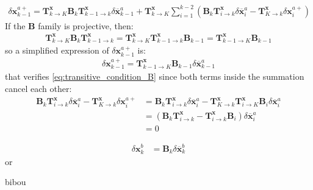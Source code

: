 \documentclass[npg, manuscript]{copernicus}
\begin{document}
\begin{align}
\delta \mathbf{x}^{a+}_{k-1} = \mathbf{T}^\mathbf{x}_{k \rightarrow K} \mathbf{B}_k \mathbf{T}^\mathbf{x}_{k-1 \rightarrow k} \delta \overline{\mathbf{x}}^a_{k-1} + \mathbf{T}^\mathbf{x}_{k \rightarrow K} \sum_{i=1}^{k-2} \left(\mathbf{B}_k \mathbf{T}^\mathbf{x}_{i \rightarrow k} \delta \overline{\mathbf{x}}^a_i - \mathbf{T}^\mathbf{x}_{K \rightarrow k} \delta \mathbf{x}^{a+}_i\right)
\end{align}
If the $\mathbf{B}$ family is projective, then:
\begin{align}
\mathbf{T}^\mathbf{x}_{k \rightarrow K} \mathbf{B}_k \mathbf{T}^\mathbf{x}_{k-1 \rightarrow k} = \mathbf{T}^\mathbf{x}_{k \rightarrow K} \mathbf{T}^\mathbf{x}_{k-1 \rightarrow k} \mathbf{B}_{k-1} = \mathbf{T}^\mathbf{x}_{k-1 \rightarrow K} \mathbf{B}_{k-1}
\end{align}
so a simplified expression of $\delta \mathbf{x}^{a+}_{k-1}$ is:
\begin{align}
\label{eq:projective_condition_B}
\boxed{\delta \mathbf{x}^{a+}_{k-1} = \mathbf{T}^\mathbf{x}_{k-1 \rightarrow K} \mathbf{B}_{k-1} \delta \overline{\mathbf{x}}^a_{k-1}}
\end{align}
that verifies \eqref{eq:transitive_condition_B} since both terms inside the summation cancel each other:
\begin{align}
\mathbf{B}_k \mathbf{T}^\mathbf{x}_{i \rightarrow k} \delta \overline{\mathbf{x}}^a_i - \mathbf{T}^\mathbf{x}_{K \rightarrow k} \delta \mathbf{x}^{a+}_i & = \mathbf{B}_k \mathbf{T}^\mathbf{x}_{i \rightarrow k} \delta \overline{\mathbf{x}}^a_i - \mathbf{T}^\mathbf{x}_{K \rightarrow k}  \mathbf{T}^\mathbf{x}_{i \rightarrow K} \mathbf{B}_i \delta \overline{\mathbf{x}}^a_i \nonumber \\
& = \left(\mathbf{B}_k \mathbf{T}^\mathbf{x}_{i \rightarrow k} - \mathbf{T}^\mathbf{x}_{i \rightarrow k} \mathbf{B}_i \right) \delta \overline{\mathbf{x}}^a_i \nonumber \\
& = 0
\end{align}

\begin{align}
\label{eq:alternative_B}
\delta \mathbf{x}^b_k & = \mathbf{B}_k \delta \overline{\mathbf{x}}^b_k
\end{align}
or

bibou

\noappendix       %
\end{document}
